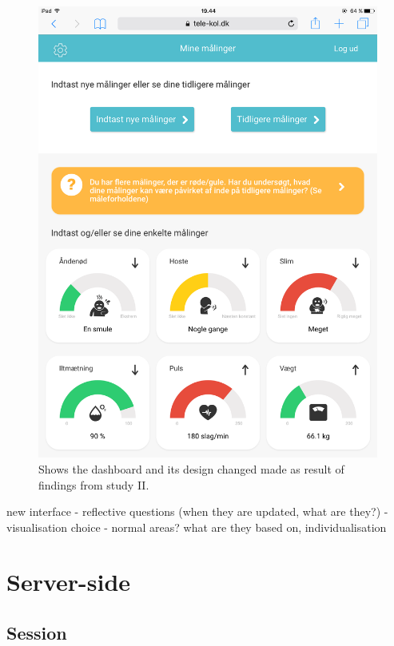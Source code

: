 \begin{figure}[h]
\begin{minipage}[b]{0.45\textwidth}
    \includegraphics[width=\textwidth]{images/implementation/db.PNG}
    \caption{Shows the dashboard and its design changed made as result of findings from study II.}
    \label{fig:db2nd}
  \end{minipage}
\end{figure}

new interface
 - reflective questions (when they are updated, what are they?)
 - visualisation choice
 - normal areas? what are they based on, individualisation
 

\section{Server-side}


\subsection{Session}



